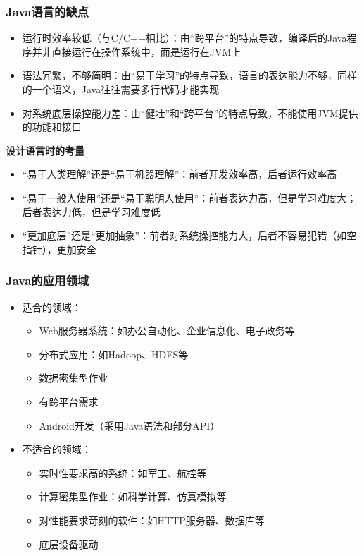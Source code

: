 \begin{frame}
  \frametitle{Java语言的缺点}
  \begin{itemize}
    \item 运行时效率较低（与C/C++相比）：由“跨平台”的特点导致，编译后的Java程序并非直接运行在操作系统中，而是运行在JVM上    \item 语法冗繁，不够简明：由“易于学习”的特点导致，语言的表达能力不够，同样的一个语义，Java往往需要多行代码才能实现
    \item 对系统底层操控能力差：由“健壮”和“跨平台”的特点导致，不能使用JVM提供的功能和接口
  \end{itemize}
  
  \begin{block}{\textbf{设计语言时的考量}}
	\begin{itemize}
		\item “易于人类理解”还是“易于机器理解”：前者开发效率高，后者运行效率高
		\item “易于一般人使用”还是“易于聪明人使用”：前者表达力高，但是学习难度大；后者表达力低，但是学习难度低
		\item “更加底层”还是“更加抽象”：前者对系统操控能力大，后者不容易犯错（如空指针），更加安全
	\end{itemize}
  \end{block}
\end{frame}

\begin{frame}
  \frametitle{Java的应用领域}
  \begin{itemize}
    \item 适合的领域：
      \begin{itemize}
        \item Web服务器系统：如办公自动化、企业信息化、电子政务等
        \item 分布式应用：如Hadoop、HDFS等
        \item 数据密集型作业
        \item 有跨平台需求
        \item Android开发（采用Java语法和部分API）
      \end{itemize}
    \item 不适合的领域：
      \begin{itemize}
        \item 实时性要求高的系统：如军工、航控等
        \item 计算密集型作业：如科学计算、仿真模拟等
        \item 对性能要求苛刻的软件：如HTTP服务器、数据库等
        \item 底层设备驱动
      \end{itemize}
  \end{itemize}
    
  
\end{frame}

